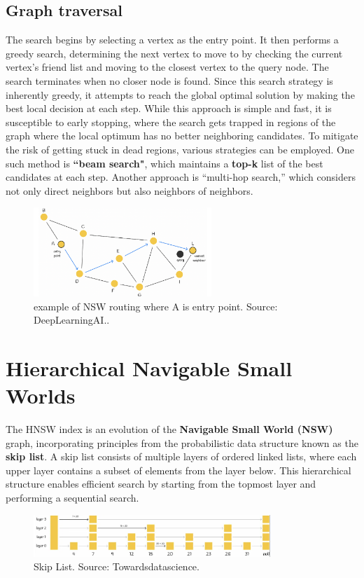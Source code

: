 \subsection{Graph traversal}
The search begins by selecting a vertex as the entry point. It then performs a greedy search, determining the next vertex to move to by checking the current vertex’s friend list and moving to the closest vertex to the query node. The search terminates when no closer node is found.  
Since this search strategy is inherently greedy, it attempts to reach the global optimal solution by making the best local decision at each step. While this approach is simple and fast, it is susceptible to early stopping, where the search gets trapped in regions of the graph where the local optimum has no better neighboring candidates.  
To mitigate the risk of getting stuck in dead regions, various strategies can be employed. One such method is \textbf{“beam search"}, which maintains a \textbf{top-k} list of the best candidates at each step. Another approach is “multi-hop search,” which considers not only direct neighbors but also neighbors of neighbors.
\begin{figure}[h]
    \centering
\includegraphics[width=0.6\textwidth]{IMAGES/immagine_2025-02-27_132919654.png}
    \caption{example of NSW routing where A is entry point. Source: DeepLearningAI.\footnotemark.}
    \label{fig:NSW traversal}
\end{figure}

\section{Hierarchical Navigable Small Worlds}
The HNSW index is an evolution of the \textbf{Navigable Small World (NSW)} graph, incorporating principles from the probabilistic data structure known as the \textbf{skip list}. A skip list consists of multiple layers of ordered linked lists, where each upper layer contains a subset of elements from the layer below. This hierarchical structure enables efficient search by starting from the topmost layer and performing a sequential search.  
\begin{figure}[h]
    \centering
\includegraphics[width=0.8\textwidth]{IMAGES/immagine_2025-02-27_133448847.png}
    \caption{Skip List. Source: Towardsdatascience.\footnotemark[2]}
    \label{fig:Skip List}
\end{figure}

